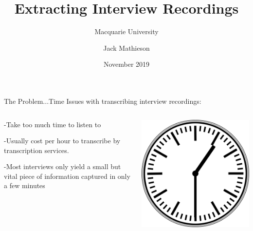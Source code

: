 \documentclass{beamer}
\title{Extracting Interview Recordings}
\author{Jack Mathieson}
\subtitle{Macquarie University}
\date{November 2019}
\begin{document}
\maketitle

\section{}
\begin{frame}{The Problem...Time}
Issues with transcribing interview recordings:
\begin{columns}
\begin{column}{0.5\textwidth}

-Take too much time to listen to 

-Usually cost per hour to transcribe by transcription services.

-Most interviews only yield a small but vital piece of information captured in only a few minutes
\end{column}
\begin{column}{0.5\textwidth}
\centering
\includegraphics[scale=0.15]{Pictures/Clock.png}


\end{column}
\end{columns}
\end{frame}
\end{document}
